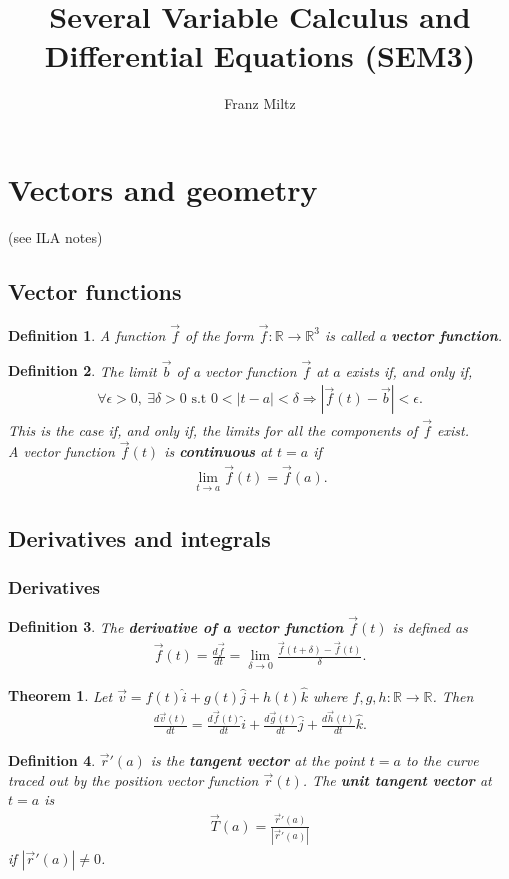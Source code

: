 \documentclass{article}
\theoremstyle{sltheorem}
\newtheorem{definition}{Definition}[section]
\newtheorem{theorem}{Theorem}[section]
\newcommand{\R}{\mathbb{R}}
\newcommand{\st}{\text{ s.t }}
\newcommand{\ih}{\widehat i}
\newcommand{\jh}{\widehat j}
\newcommand{\kh}{\widehat k}
\newcommand*\B[1]{\textbf{#1}}
\begin{document}
\title{Several Variable Calculus and Differential Equations (SEM3)}
\author{Franz Miltz}
\maketitle
\tableofcontents
\section{Vectors and geometry}
(see ILA notes)
\setcounter{subsection}{4}
\subsection{Vector functions}
\begin{definition}
    A function $\vec f$ of the form $\vec f: \R \to \R^3$ is called a \B{vector function}.
\end{definition}
\begin{definition}
    The limit $\vec b$ of a vector function $\vec f$ at $a$ exists if, and only if,
    \begin{align*}
        \forall \epsilon > 0,\: \exists \delta > 0 \st 0 < |t-a| < \delta \Rightarrow |\vec f(t) - \vec b|<\epsilon.
    \end{align*}
    This is the case if, and only if, the limits for all the components of $\vec f$ exist.\\
    A vector function $\vec f(t)$ is \B{continuous} at $t=a$ if
    \begin{align*}
        \lim_{t\to a} \vec f (t) = \vec f (a). 
    \end{align*}
\end{definition}
\subsection{Derivatives and integrals}
\subsubsection{Derivatives}
\begin{definition}
    The \B{derivative of a vector function} $\vec f(t)$ is defined as
    \begin{align*}
        \vec f(t) = \frac{d\vec f}{dt} = \lim_{\delta \to 0} \frac{\vec f(t+\delta)-\vec f(t)}{\delta}.
    \end{align*}
\end{definition}
\begin{theorem}
    Let $\vec v = f(t)\ih + g(t)\jh + h(t)\kh$ where $f,g,h: \R\to\R$. Then
    \begin{align*}
        \frac{d\vec v(t)}{dt} = \frac{d\vec f(t)}{dt}\ih + \frac{d\vec g(t)}{dt}\jh + \frac{d\vec h(t)}{dt}\kh.
    \end{align*}
\end{theorem}
\begin{definition}
    $\vec r'(a)$ is the \B{tangent vector} at the point $t=a$ to the curve traced out by the position vector function $\vec r(t)$.
    The \B{unit tangent vector} at $t=a$ is
    \begin{align*}
        \vec T(a) = \frac{\vec r'(a)}{|\vec r'(a)|}
    \end{align*}
    if $|\vec r'(a)| \not= 0$.
\end{definition}
\end{document}
